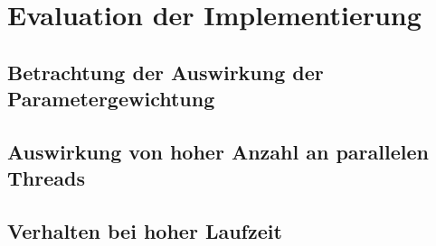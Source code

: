 \chapter{Evaluation der Implementierung}
\label{evaluation}
\section{Betrachtung der Auswirkung der Parametergewichtung}

\section{Auswirkung von hoher Anzahl an parallelen Threads}

\section{Verhalten bei hoher Laufzeit}